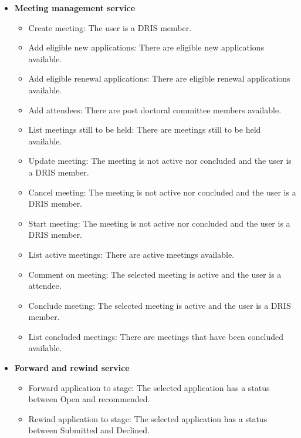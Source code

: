 \documentclass[12pt]{article}
\begin{document}
\begin{itemize}
	\item \textbf{Meeting management service}
		\begin{itemize}			
			\item Create meeting: The user is a DRIS member.
			\item Add eligible new applications: There are eligible new applications available.
			\item Add eligible renewal applications: There are eligible renewal applications available.
			\item Add attendees: There are post doctoral committee members available.
			\item List meetings still to be held: There are meetings still to be held available.
			\item Update meeting: The meeting is not active nor concluded and the user is a DRIS member.
			\item Cancel meeting: The meeting is not active nor concluded and the user is a DRIS member.
			\item Start meeting: The meeting is not active nor concluded and the user is a DRIS member.
			\item List active meetings: There are active meetings available.
			\item Comment on meeting: The selected meeting is active and the user is a attendee.
			\item Conclude meeting: The selected meeting is active and the user is a DRIS member.	
			\item List concluded meetings: There are meetings that have been concluded available.						
		\end{itemize}

	\item \textbf{Forward and rewind service}
		\begin{itemize}
			\item Forward application to stage: The selected application has a status between Open and recommended.
			\item Rewind application to stage: The selected application has a status between Submitted and Declined.						
		\end{itemize}


\end{itemize}
\end{document}
